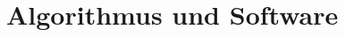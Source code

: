 \documentclass[../main.tex]{subfiles}
\begin{document}
\section{Algorithmus und Software}
\end{document}
